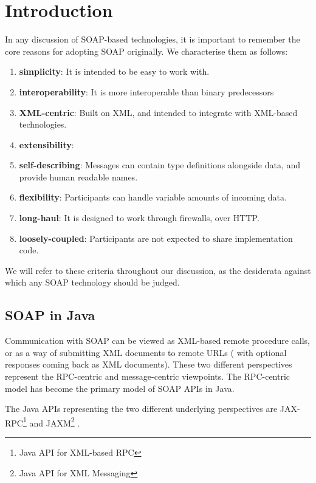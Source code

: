 \section{Introduction}
\label{introduction}

In any discussion of SOAP-based technologies, it is important to
remember the core reasons for adopting SOAP originally. We
characterise them as follows:

\begin{enumerate}
\item \textbf{simplicity}: It is intended to be easy to work with.
\item \textbf{interoperability}: It is more interoperable than binary predecessors
\item \textbf{XML-centric}: Built on XML, and intended to integrate
with XML-based technologies.
\item \textbf{extensibility}: 
\item \textbf{self-describing}: Messages can contain type definitions alongside
data, and provide human readable names.
\item \textbf{flexibility}: Participants can handle variable amounts of
incoming data.
\item \textbf{long-haul}: It is designed to work through firewalls, over HTTP.
\item \textbf{loosely-coupled}: Participants are not expected to share
implementation code.
\end{enumerate}

We will refer to these criteria throughout our discussion, as the
desiderata against which any SOAP technology should be judged.

\subsection{SOAP in Java}
\label{intro:java}

Communication with SOAP can be viewed as XML-based remote procedure
calls, or as a way of submitting XML documents to remote URLs ( with
optional responses coming back as XML documents). These two different
perspectives represent the RPC-centric and message-centric
viewpoints. The RPC-centric model has become the primary
model of SOAP APIs in Java.

The Java APIs representing the two different underlying perspectives
are JAX-RPC\footnote{Java API for XML-based RPC}
\cite{spec:JAX-RPC-11} and JAXM\footnote{Java API for XML Messaging}
\cite{spec:JAX-M-11}. 


